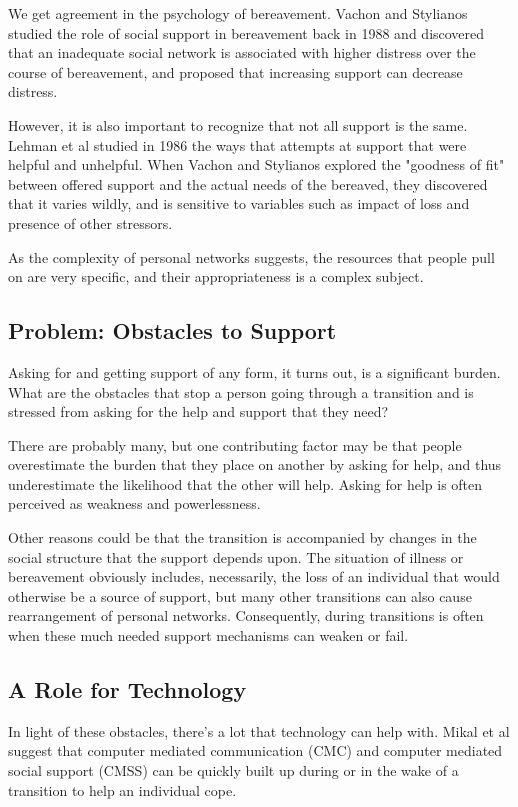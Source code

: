     We get agreement in the psychology of bereavement.
    Vachon and Stylianos studied the role of social support in bereavement back in 1988
    and discovered that an inadequate social network is associated with higher distress
    over the course of bereavement,
    and proposed that increasing support can decrease distress.

    However, it is also important to recognize that not all support is the same.
    Lehman et al studied in 1986 the ways that attempts at support that were helpful and unhelpful.
    \cite{lehman_86}
    When Vachon and Stylianos explored the "goodness of fit" between offered support and the actual needs of
    the bereaved, they discovered that it varies wildly, and is sensitive to variables such as impact of loss
    and presence of other stressors.
    \cite{vachon_88}
    
    As the complexity of personal networks suggests, the resources that people pull on
    are very specific,
    and their appropriateness is a complex subject.

  \subsection{Problem: Obstacles to Support}
    Asking for and getting support of any form, it turns out,
    is a significant burden.
    What are the obstacles that stop a person going through a transition and is stressed
    from asking for the help and support that they need?

    There are probably many, but one contributing factor may be that
    people overestimate the burden that they place on another by asking for help,
    and thus underestimate the likelihood that the other will help. \cite{flynn_08}
    Asking for help is often perceived as weakness and powerlessness. \cite{lee_97}

    Other reasons could be that the transition is accompanied by changes in the social structure
    that the support depends upon.
    The situation of illness or bereavement obviously includes, necessarily,
    the loss of an individual that would otherwise be a source of support,
    but many other transitions can also cause rearrangement of personal networks.
    Consequently, during transitions is often when these much needed
    support mechanisms can weaken or fail.
    \cite{mikal_13}

  \subsection{A Role for Technology}
    In light of these obstacles, there's a lot that technology can help with.
    Mikal et al suggest that computer mediated communication (CMC)
    and computer mediated social support (CMSS) can be quickly built up during or in the wake of
    a transition to help an individual cope.
    \cite{mikal_13}
    
